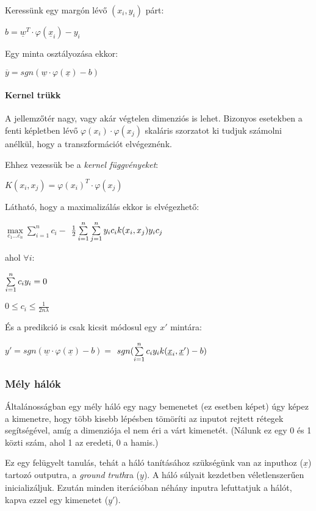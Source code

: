 \noindent
Keressünk egy margón lévő $ (x_i, y_i) $ párt:

$ b = \underline{w}^T \cdot \varphi(\underline{x}_i)  - y_i$


\noindent
Egy minta osztályozása ekkor:

$ \overline{y} = sgn(\underline{w} \cdot \varphi(\underline{x}) - b) $


\paragraph{Kernel trükk} 

A jellemzőtér nagy, vagy akár végtelen dimenziós is lehet. Bizonyos esetekben a fenti képletben lévő
$ \varphi(x_i) \cdot \varphi(x_j) $ skaláris szorzatot ki tudjuk számolni anélkül, hogy a transzformációt 
elvégeznénk.



\noindent
Ehhez vezessük be a \textit{kernel függvényeket}:

$ K(x_i, x_j) = \varphi(x_i)^T \cdot \varphi(x_j) $

\noindent
Látható, hogy a maximalizálás ekkor is elvégezhető:


$ \max\limits_{c_1 \dots c_n} \sum\limits_{i=1}^{n}c_i -  $
$ \frac{1}{2}\sum\limits_{{i}=1}^{n}\sum\limits_{{j}=1}^{n} y_i c_i k(x_i, x_j) y_i c_j $

\noindent
ahol $ \forall i: $

$  \sum\limits_{{i}=1}^{n} c_i y_i = 0 $

$ 0 \leq c_i \leq \frac{1}{2n\lambda} $

\noindent
És a predikció is csak kicsit módosul
egy $ x' $ mintára:

$ y' = sgn(\underline{w} \cdot \varphi(\underline{x}) - b) = $
$ sgn(\sum\limits_{{i}=1}^{n} c_i y_i k(\underline{x}_i, \underline{x}') - b) $




\subsubsection{Mély hálók}

Általánosságban egy mély háló egy nagy bemenetet (ez esetben képet) úgy képez
a kimenetre, hogy több kisebb lépésben tömöríti az inputot rejtett rétegek segítségével,
amíg a dimenziója el nem éri a várt kimenetét. 
(Nálunk ez egy 0 és 1 közti szám, ahol 1 az eredeti, 0 a hamis.)


Ez egy felügyelt tanulás, tehát a háló tanításához szükségünk van az inputhoz ($ \underline{x} $) 
tartozó outputra, a \textit{ground truth}ra ($ \underline{y} $). 
A háló súlyait kezdetben véletlenszerűen inicializáljuk.
Ezután minden iterációban néhány inputra lefuttatjuk a hálót, 
kapva ezzel egy kimenetet ($ \underline{y}' $).

